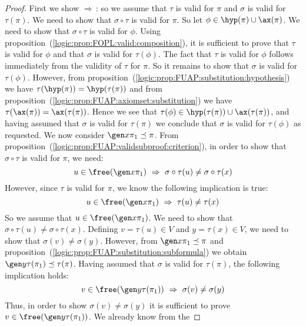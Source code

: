 \begin{proof}
First we show $\Rightarrow$\,: so we assume that $\tau$ is valid for
$\pi$ and $\sigma$ is valid for $\tau(\pi)$. We need to show that
$\sigma\circ\tau$ is valid for $\pi$. So let
$\phi\in\hyp(\pi)\cup\ax(\pi)$. We need to show that
$\sigma\circ\tau$ is valid for $\phi$. Using
proposition~(\ref{logic:prop:FOPL:valid:composition}), it is
sufficient to prove that $\tau$ is valid for $\phi$ and that
$\sigma$ is valid for $\tau(\phi)$. The fact that $\tau$ is valid
for $\phi$ follows immediately from the validity of $\tau$ for
$\pi$. So it remains to show that $\sigma$ is valid for
$\tau(\phi)$. However, from
proposition~(\ref{logic:prop:FUAP:substitution:hypothesis}) we have
$\tau(\hyp(\pi))=\hyp(\tau(\pi))$ and from
proposition~(\ref{logic:prop:FUAP:axiomset:substitution}) we have
$\tau(\ax(\pi))=\ax(\tau(\pi))$. Hence we see that
$\tau(\phi)\in\hyp(\tau(\pi))\cup\ax(\tau(\pi))$, and having assumed
that $\sigma$ is valid for $\tau(\pi)$ we conclude that $\sigma$ is
valid for $\tau(\phi)$ as requested. We now consider $\gen
x\pi_{1}\preceq\pi$. From
proposition~(\ref{logic:prop:FUAP:validsubproof:criterion}), in
order to show that $\sigma\circ\tau$ is valid for $\pi$, we need:
    \begin{equation}\label{logic:eqn:FUAP:validsub:composition:1}
    u\in\free(\gen x\pi_{1})\ \Rightarrow\
    \sigma\circ\tau(u)\neq\sigma\circ\tau(x)
    \end{equation}
However, since $\tau$ is valid for $\pi$, we know the following
implication is true:
    \begin{equation}\label{logic:eqn:FUAP:validsub:composition:2}
    u\in\free(\gen x\pi_{1})\ \Rightarrow\
    \tau(u)\neq\tau(x)
    \end{equation}
So we assume that $u\in\free(\gen x\pi_{1})$. We need to show that
$\sigma\circ\tau(u)\neq\sigma\circ\tau(x)$. Defining $v=\tau(u)\in
V$ and $y=\tau(x)\in V$, we need to show that
$\sigma(v)\neq\sigma(y)$. However, from $\gen x\pi_{1}\preceq\pi$
and proposition~(\ref{logic:prop:FUAP:substitution:subformula}) we
obtain $\gen y\tau(\pi_{1})\preceq\tau(\pi)$. Having assumed that
$\sigma$ is valid for $\tau(\pi)$, the following implication holds:
    \begin{equation}\label{logic:eqn:FUAP:validsub:composition:3}
    v\in\free(\gen y\tau(\pi_{1}))\ \Rightarrow\
    \sigma(v)\neq\sigma(y)
    \end{equation}
Thus, in order to show $\sigma(v)\neq\sigma(y)$ it is sufficient to
prove $v\in\free(\gen y\tau(\pi_{1}))$. We already know from the

\end{proof}
